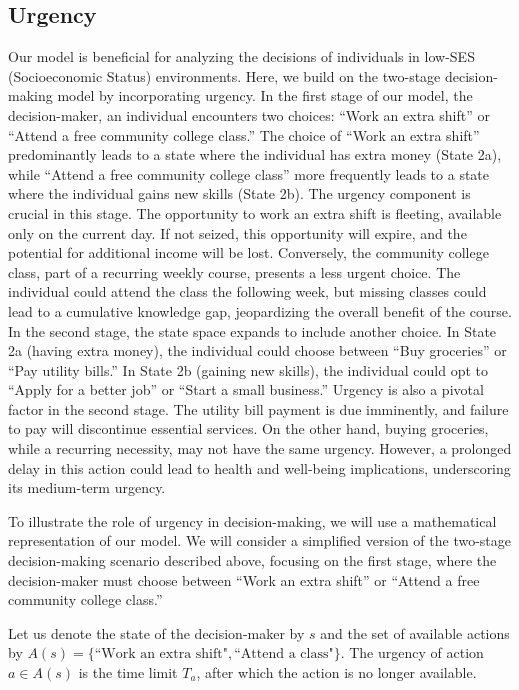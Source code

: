 \documentclass[
]{report}
\begin{document}
\hypertarget{urgency}{%
\subsection{Urgency}\label{urgency}}

Our model is beneficial for analyzing the decisions of individuals in
low-SES (Socioeconomic Status) environments. Here, we build on the
two-stage decision-making model by incorporating urgency. In the first
stage of our model, the decision-maker, an individual encounters two
choices: ``Work an extra shift'' or ``Attend a free community college
class.'' The choice of ``Work an extra shift'' predominantly leads to a
state where the individual has extra money (State 2a), while ``Attend a
free community college class'' more frequently leads to a state where
the individual gains new skills (State 2b). The urgency component is
crucial in this stage. The opportunity to work an extra shift is
fleeting, available only on the current day. If not seized, this
opportunity will expire, and the potential for additional income will be
lost. Conversely, the community college class, part of a recurring
weekly course, presents a less urgent choice. The individual could
attend the class the following week, but missing classes could lead to a
cumulative knowledge gap, jeopardizing the overall benefit of the
course. In the second stage, the state space expands to include another
choice. In State 2a (having extra money), the individual could choose
between ``Buy groceries'' or ``Pay utility bills.'' In State 2b (gaining
new skills), the individual could opt to ``Apply for a better job'' or
``Start a small business.'' Urgency is also a pivotal factor in the
second stage. The utility bill payment is due imminently, and failure to
pay will discontinue essential services. On the other hand, buying
groceries, while a recurring necessity, may not have the same urgency.
However, a prolonged delay in this action could lead to health and
well-being implications, underscoring its medium-term urgency.

To illustrate the role of urgency in decision-making, we will use a
mathematical representation of our model. We will consider a simplified
version of the two-stage decision-making scenario described above,
focusing on the first stage, where the decision-maker must choose
between ``Work an extra shift'' or ``Attend a free community college
class.''

Let us denote the state of the decision-maker by \(s\) and the set of
available actions by
\(A(s) = \{\text{``Work an extra shift"}, \text{``Attend a class"}\}\).
The urgency of action \(a \in A(s)\) is the time limit \(T_a\), after
which the action is no longer available.
\end{document}
